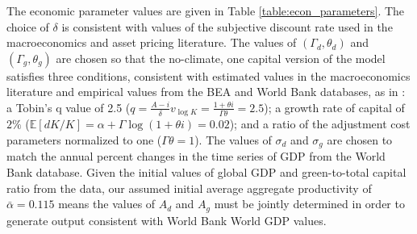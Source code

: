 \documentclass[12pt]{article}
\begin{document}
\begin{appendices}





The economic parameter values are given in Table \ref{table:econ_parameters}. The choice of $\delta$ is consistent with values of the subjective discount rate used in the macroeconomics and asset pricing literature. The values of $(\Gamma_d, \theta_d)$ and $(\Gamma_g, \theta_g)$ are chosen so that the no-climate, one capital version of the model satisfies three conditions, consistent with estimated values in the macroeconomics literature and empirical values from the BEA and World Bank databases, as in \cite{BarnettBrockHansen:2020}: a Tobin's q value of 2.5 ($q = \frac{A-i}{\delta} v_{\log K} = \frac{1 + \theta i}{\Gamma \theta } = 2.5$); a growth rate of capital of $2\%$ ($\mathbb{E}[dK/K] = \alpha + \Gamma \log (1+\theta i) = 0.02$); and a ratio of the adjustment cost parameters normalized to one ($\Gamma \theta = 1$). The values of $\sigma_d$ and $\sigma_g$ are chosen to match the annual percent changes in the time series of GDP from the World Bank database. Given the initial values of global GDP and green-to-total capital ratio from the data, our assumed initial average aggregate productivity of $\bar{\alpha} = 0.115$ means the values of $A_d$ and $A_g$ must be jointly determined in order to generate output consistent with World Bank World GDP values. 



\end{appendices}
\end{document}
